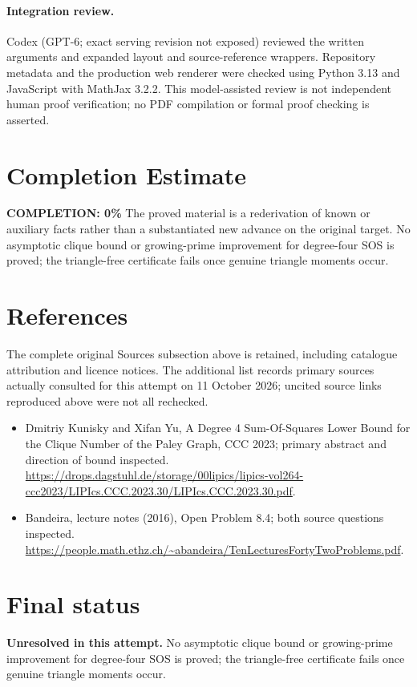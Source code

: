 \documentclass[11pt]{article}
\begin{document}
\paragraph{Integration review.} Codex (GPT-6; exact serving revision not exposed) reviewed the written arguments and expanded layout and source-reference wrappers. Repository metadata and the production web renderer were checked using Python 3.13 and JavaScript with MathJax 3.2.2. This model-assisted review is not independent human proof verification; no PDF compilation or formal proof checking is asserted.

\section{Completion Estimate}
\noindent\textbf{COMPLETION: 0\%}
The proved material is a rederivation of known or auxiliary facts rather than a substantiated new advance on the original target. No asymptotic clique bound or growing-prime improvement for degree-four SOS is proved; the triangle-free certificate fails once genuine triangle moments occur.
\section{References}
The complete original Sources subsection above is retained, including catalogue attribution and licence notices. The additional list records primary sources actually consulted for this attempt on 11 October 2026; uncited source links reproduced above were not all rechecked.
\begin{itemize}
\item Dmitriy Kunisky and Xifan Yu, A Degree 4 Sum-Of-Squares Lower Bound for the Clique Number of the Paley Graph, CCC 2023; primary abstract and direction of bound inspected. \url{https://drops.dagstuhl.de/storage/00lipics/lipics-vol264-ccc2023/LIPIcs.CCC.2023.30/LIPIcs.CCC.2023.30.pdf}.
\item Bandeira, lecture notes (2016), Open Problem 8.4; both source questions inspected. \url{https://people.math.ethz.ch/~abandeira/TenLecturesFortyTwoProblems.pdf}.
\end{itemize}
\section{Final status}
\textbf{Unresolved in this attempt.} No asymptotic clique bound or growing-prime improvement for degree-four SOS is proved; the triangle-free certificate fails once genuine triangle moments occur.
\end{document}
